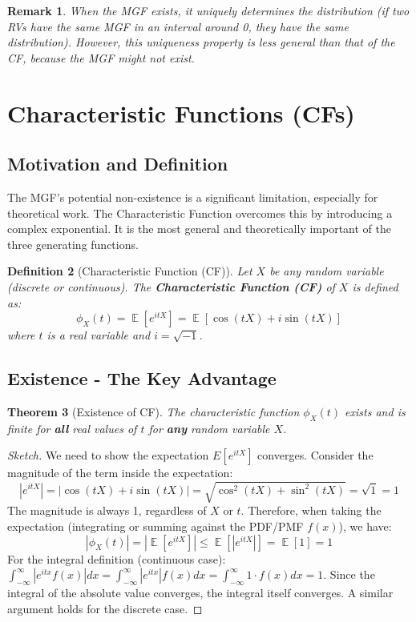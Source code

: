 \documentclass[11pt, letterpaper]{article}
\newtheorem{theorem}{Theorem}[section]
\newtheorem{definition}[theorem]{Definition}
\newtheorem{remark}[theorem]{Remark}
\DeclareMathOperator{\E}{\mathbb{E}}
\begin{document}
\begin{remark}
When the MGF exists, it uniquely determines the distribution (if two RVs have the same MGF in an interval around 0, they have the same distribution). However, this uniqueness property is less general than that of the CF, because the MGF might not exist.
\end{remark}

\section{Characteristic Functions (CFs)}

\subsection{Motivation and Definition}

The MGF's potential non-existence is a significant limitation, especially for theoretical work. The Characteristic Function overcomes this by introducing a complex exponential. It is the most general and theoretically important of the three generating functions.

\begin{definition}[Characteristic Function (CF)]
Let $X$ be any random variable (discrete or continuous). The \textbf{Characteristic Function (CF)} of $X$ is defined as:
\begin{equation}
    \phi_X(t) = \E[e^{itX}] = \E[\cos(tX) + i \sin(tX)]
\end{equation}
where $t$ is a real variable and $i = \sqrt{-1}$.
\end{definition}

\subsection{Existence - The Key Advantage}

\begin{theorem}[Existence of CF]
The characteristic function $\phi_X(t)$ exists and is finite for \textbf{all} real values of $t$ for \textbf{any} random variable $X$.
\end{theorem}
\begin{proof}[Sketch]
We need to show the expectation $E[e^{itX}]$ converges. Consider the magnitude of the term inside the expectation:
$$ |e^{itX}| = |\cos(tX) + i \sin(tX)| = \sqrt{\cos^2(tX) + \sin^2(tX)} = \sqrt{1} = 1 $$
The magnitude is always 1, regardless of $X$ or $t$. Therefore, when taking the expectation (integrating or summing against the PDF/PMF $f(x)$), we have:
$$ |\phi_X(t)| = |\E[e^{itX}]| \le \E[|e^{itX}|] = \E[1] = 1 $$
For the integral definition (continuous case): $\int_{-\infty}^{\infty} |e^{itx} f(x)| dx = \int_{-\infty}^{\infty} |e^{itx}| f(x) dx = \int_{-\infty}^{\infty} 1 \cdot f(x) dx = 1$. Since the integral of the absolute value converges, the integral itself converges. A similar argument holds for the discrete case.
\end{proof}
\end{document}
